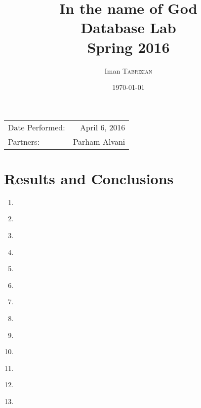 \documentclass{article}
\title{In the name of God \\ Database Lab \\ Spring 2016} %
\author{Iman \textsc{Tabrizian}} %
\date{\today} %
\begin{document}
\maketitle %

\begin{center}
	\begin{tabular}{l r}
		Date Performed: & April 6, 2016 \\ %
		Partners: & Parham Alvani \\ %
	\end{tabular}
\end{center}



\section{Results and Conclusions}
\begin{enumerate}
	\item
		\inputminted{sql}{sql/im-par-1.sql}
	\item
		\inputminted{sql}{sql/im-par-1-a.sql}
	\item
		\inputminted{sql}{sql/im-par-1-insert.sql}
	\item
		\inputminted{sql}{sql/im-par-2.sql}
	\item
		\inputminted{sql}{sql/im-par-2-select.sql}
	\item
		\inputminted{sql}{sql/im-par-3.sql}
	\item
		\inputminted{sql}{sql/im-par-3-exec.sql}
	\item
		\inputminted{sql}{sql/im-par-4.sql}
	\item
		\inputminted{sql}{sql/im-par-4-insert-query.sql}
	\item
		\inputminted{sql}{sql/im-par-4-select-res.sql}
	\item
		\inputminted{sql}{sql/im-par-4-trigger.sql}
	\item
		\inputminted{sql}{sql/im-par-5.sql}
	\item
		\inputminted{sql}{sql/im-par-5-exec.sql}
\end{enumerate}
\end{document}
